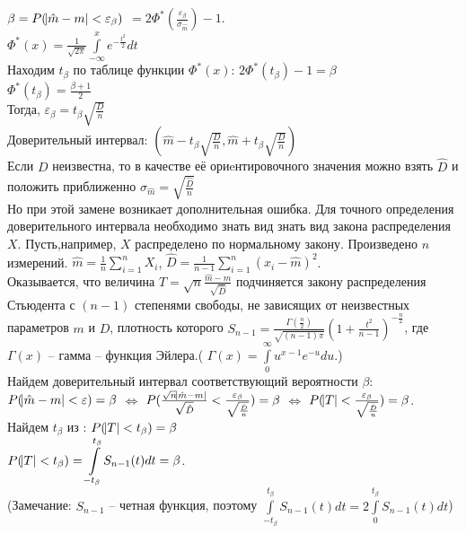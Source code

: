 \documentclass[russian, 12pt, fleqn]{article}
\begin{document}
 $\beta = P(\abs{\hat{m} - m} < \varepsilon_\beta)$
$ = 2\Phi^*(\frac{\varepsilon_\beta}{\sigma_{\hat{m}}}) - 1$.\\
$\Phi^*(x) = \frac{1}{\sqrt{2\pi}} \displaystyle{\int \limits _{-\infty} ^ {x}} e^{-\frac{t^2}{2}} dt$\\
Находим $t_\beta$ по таблице функции $\Phi^*(x)$: $2\Phi^*(t_\beta) - 1 = \beta$\\
$\Phi^*(t_\beta) = \frac{\beta + 1}{2}$\\
Тогда, $\varepsilon_\beta = t_{\beta} \sqrt{\frac{D}{n}}$\\
Доверительный интервал: $(\hat{m} - t_\beta \sqrt{\frac{D}{n}}, \hat{m} + t_\beta \sqrt{\frac{D}{n}})$\\
Если $D$ неизвестна, то в качестве её ориeнтировочного значения  можно взять $\hat{D}$ и положить приближенно $\sigma_{\hat{m}} = \sqrt{ \frac{\hat{D}}{n} }$\\
Но при этой замене возникает дополнительная ошибка. Для точного определения доверительного интервала необходимо знать вид знать вид закона распределения $X$.
Пусть,например, $X$ 
распределено по нормальному закону. Произведено $n$ измерений. $\hat{m} = \frac{1}{n} \displaystyle{\sum \limits_{i=1} ^ {n} } X_i$, $\hat{D} = \frac{1}{n - 1} \displaystyle{\sum \limits_{i=1} ^ {n} } (x_i - \hat{m})^2$.\\
Оказывается, что величина $T = \sqrt{n} \frac{\hat{m} - m}{\sqrt{\hat{D}}}$ подчиняется закону распределения Стьюдента с $(n-1)$ степенями свободы, не зависящих от неизвестных параметров $m$ и $D$, плотность которого $S_{n-1} = \frac{\Gamma(\frac{n}{2})}{\sqrt{(n-1)\pi}}(1 + \frac{t^2}{n - 1})^{-\frac{n}{2}}$, где $\Gamma (x)$ -- гамма -- функция Эйлера.( $\Gamma (x) = \displaystyle{\int \limits_{0} ^ {\infty} } u^{x - 1} e ^{-u}du$.)\\
Найдем доверительный интервал соответствующий вероятности $\beta$: \\
$P(\abs{\hat{m} - m} < \varepsilon) = \beta$ $\Leftrightarrow$ $P(\frac{\sqrt{n} \abs{\hat{m} - m}}{\sqrt{\hat{D}}} < \frac{\varepsilon_\beta}{\sqrt{\frac{\hat{D}}{n}}}) = \beta$ $\Leftrightarrow$  $P(\abs{T} < \frac{\varepsilon_\beta}{\sqrt{\frac{\hat{D}}{n}}} )= \beta $.\\
Найдем  $t_\beta$ из : $P(\abs{T} < t_\beta) = \beta$\\
$P(\abs{T} < t_\beta) = \displaystyle{\int \limits_{-t_{\beta}}^{t_{\beta}}} S_{n-1}(t) dt = \beta$.\\
(Замечание: $S_{n-1}$ -- четная функция, поэтому  $\displaystyle{\int \limits_{-t_{\beta}}^{t_{\beta}}} S_{n-1}(t) dt =  2\displaystyle{\int \limits_{0}^{t_{\beta}}} S_{n-1}(t) dt$)\\
\end{document}
